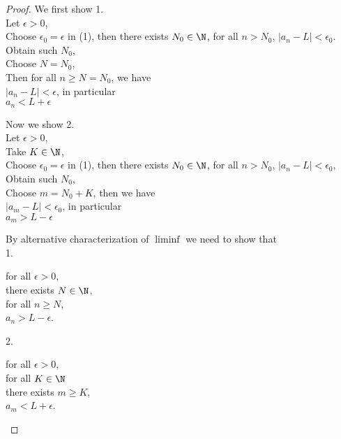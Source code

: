 \documentclass{assignment}
\begin{document}
\begin{proof}[Proof]
        We first show 1. \\
        Let $\epsilon > 0$, \\
        Choose $\epsilon_0 = \epsilon$ in (1), then there exists $N_0 \in \N$, for all $n > N_0$, $|a_n - L| < \epsilon_0$. \\
        Obtain such $N_0$, \\
        Choose $N = N_0$, \\
        Then for all $n \ge N = N_0$, we have \\
        $|a_n - L| < \epsilon$, in particular \\
        $a_n < L + \epsilon$

        Now we show 2. \\
        Let $\epsilon > 0$, \\
        Take $K \in \N$, \\
        Choose $\epsilon_0 = \epsilon$ in (1), then there exists $N_0 \in \N$, for all $n > N_0$, $|a_n -L| < \epsilon_0$, \\
        Obtain such $N_0$, \\
        Choose $m = N_0 + K$, then we have\\
        $|a_m - L| < \epsilon_0$, in particular \\
        $a_m > L - \epsilon$

        By alternative characterization of $\liminf$ we need to show that \\
        1. \begin{center}
            \parbox{\linewidth}{
                \linewidth
                for all $\epsilon > 0$, \\
                \hspace*{1em} there exists $N \in \N$, \\
                \hspace*{2em} for all $n \ge N$, \\
                \hspace*{3em} $a_n > L - \epsilon$.
            }
        \end{center}
        2. \begin{center}
            \parbox{\linewidth}{
                \linewidth
                for all $\epsilon > 0$, \\
                \hspace*{1em} for all $K \in \N$ \\
                \hspace*{2em} there exists $m \ge K$, \\
                \hspace*{3em} $a_m < L + \epsilon$.
            }
        \end{center}


\end{proof}
\end{document}
